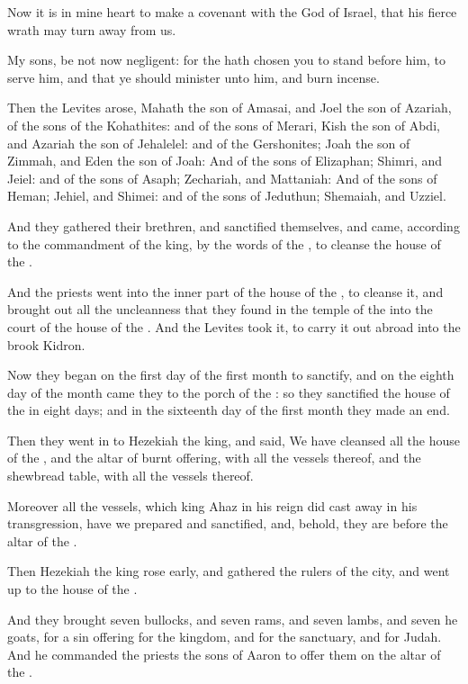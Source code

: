 \Verse Now it is in mine heart to make a covenant with the \LORD God of Israel, that his fierce wrath may turn away from us.

\Verse My sons, be not now negligent: for the \LORD hath chosen you to stand before him, to serve him, and that ye should minister unto him, and burn incense.

\Verse Then the Levites arose, Mahath the son of Amasai, and Joel the son of Azariah, of the sons of the Kohathites: and of the sons of Merari, Kish the son of Abdi, and Azariah the son of Jehalelel: and of the Gershonites; Joah the son of Zimmah, and Eden the son of Joah: \Verse And of the sons of Elizaphan; Shimri, and Jeiel: and of the sons of Asaph; Zechariah, and Mattaniah: \Verse And of the sons of Heman; Jehiel, and Shimei: and of the sons of Jeduthun; Shemaiah, and Uzziel.

\Verse And they gathered their brethren, and sanctified themselves, and came, according to the commandment of the king, by the words of the \LORD, to cleanse the house of the \LORD.

\Verse And the priests went into the inner part of the house of the \LORD, to cleanse it, and brought out all the uncleanness that they found in the temple of the \LORD into the court of the house of the \LORD. And the Levites took it, to carry it out abroad into the brook Kidron.

\Verse Now they began on the first day of the first month to sanctify, and on the eighth day of the month came they to the porch of the \LORD: so they sanctified the house of the \LORD in eight days; and in the sixteenth day of the first month they made an end.

\Verse Then they went in to Hezekiah the king, and said, We have cleansed all the house of the \LORD, and the altar of burnt offering, with all the vessels thereof, and the shewbread table, with all the vessels thereof.

\Verse Moreover all the vessels, which king Ahaz in his reign did cast away in his transgression, have we prepared and sanctified, and, behold, they are before the altar of the \LORD.

\Verse Then Hezekiah the king rose early, and gathered the rulers of the city, and went up to the house of the \LORD.

\Verse And they brought seven bullocks, and seven rams, and seven lambs, and seven he goats, for a sin offering for the kingdom, and for the sanctuary, and for Judah. And he commanded the priests the sons of Aaron to offer them on the altar of the \LORD.

